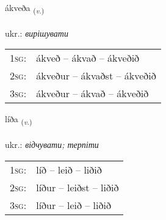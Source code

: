 \documentclass[frontgrid, backgrid]{flacards}\usepackage[]{graphicx}\usepackage[]{xcolor}
\begin{document}
\renewcommand{\blhead}{\vskip5pt {\small\bfseries\footnotesize Sagnorð | дієслово }}
\renewcommand{\bcfoot}{\vskip5pt \hspace{2pt}{\small\bfseries\footnotesize 1K}}


{ákveða \small{\textsubscript{(\textit{v.})}} \\[1ex] %
\textphonetic{[auːkʰvɛða]} \\
ukr.: \emph{вирішувати} \\  [2ex]
\renewcommand*{\arraystretch}{0.8}
\begin{tabular}{p{1cm}l}
\textsc{1sg}: & ákveð -- ákvað -- ákveðið \\ 
\textsc{2sg}: & ákveður -- ákvaðst -- ákveðið \\ 
\textsc{3sg}: & ákveður -- ákvað -- ákveðið \\ 
\end{tabular}
}

\renewcommand{\flhead}{\vskip5pt \fboxsep=0pt {\small\bfseries\footnotesize Sagnorð | дієслово}}
\renewcommand{\fcfoot}{\vskip5pt \fboxsep=0pt \hspace{2pt}{\small\bfseries\footnotesize 1K}}

\renewcommand{\blhead}{\vskip5pt {\small\bfseries\footnotesize Sagnorð | дієслово }}
\renewcommand{\bcfoot}{\vskip5pt \hspace{2pt}{\small\bfseries\footnotesize 1K}}


{líða \small{\textsubscript{(\textit{v.})}} \\[1ex] %
\textphonetic{[liːða]} \\
ukr.: \emph{відчувати; терпіти} \\  [2ex]
\renewcommand*{\arraystretch}{0.8}
\begin{tabular}{p{1cm}l}
\textsc{1sg}: & líð -- leið -- liðið \\ 
\textsc{2sg}: & líður -- leiðst -- liðið \\ 
\textsc{3sg}: & líður -- leið -- liðið \\ 
\end{tabular}
}
\end{document}
